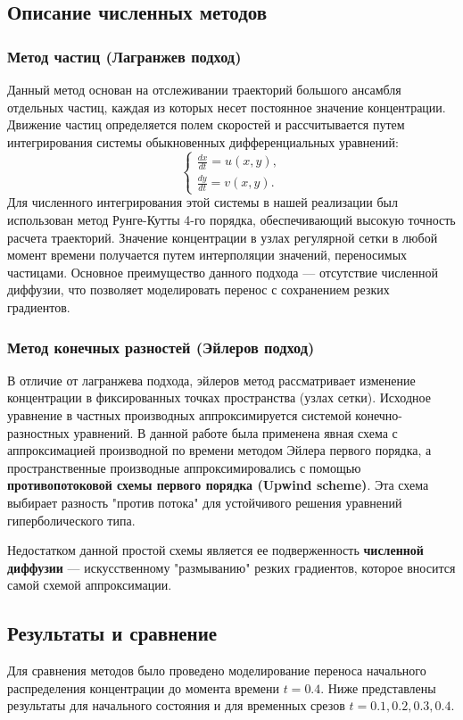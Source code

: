 \documentclass[a4paper,12pt]{article}
\begin{document}
\subsection{Описание численных методов}

\subsubsection{Метод частиц (Лагранжев подход)}
Данный метод основан на отслеживании траекторий большого ансамбля отдельных частиц, каждая из которых несет постоянное значение концентрации. Движение частиц определяется полем скоростей и рассчитывается путем интегрирования системы обыкновенных дифференциальных уравнений:
$$
\begin{cases}
    \frac{dx}{dt}=u(x,y), \\
    \frac{dy}{dt}=v(x,y).
\end{cases}
$$
Для численного интегрирования этой системы в нашей реализации был использован метод Рунге-Кутты 4-го порядка, обеспечивающий высокую точность расчета траекторий. Значение концентрации в узлах регулярной сетки в любой момент времени получается путем интерполяции значений, переносимых частицами. Основное преимущество данного подхода — отсутствие численной диффузии, что позволяет моделировать перенос с сохранением резких градиентов.

\subsubsection{Метод конечных разностей (Эйлеров подход)}
В отличие от лагранжева подхода, эйлеров метод рассматривает изменение концентрации в фиксированных точках пространства (узлах сетки). Исходное уравнение в частных производных аппроксимируется системой конечно-разностных уравнений. В данной работе была применена явная схема с аппроксимацией производной по времени методом Эйлера первого порядка, а пространственные производные аппроксимировались с помощью \textbf{противопотоковой схемы первого порядка (Upwind scheme)}. Эта схема выбирает разность "против потока" для устойчивого решения уравнений гиперболического типа.

Недостатком данной простой схемы является ее подверженность \textbf{численной диффузии} — искусственному "размыванию" резких градиентов, которое вносится самой схемой аппроксимации.

\subsection{Результаты и сравнение}
Для сравнения методов было проведено моделирование переноса начального распределения концентрации до момента времени $t=0.4$. Ниже представлены результаты для начального состояния и для временных срезов $t=0.1, 0.2, 0.3, 0.4$.
\end{document}
